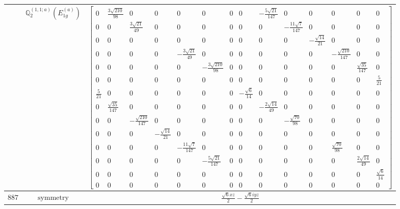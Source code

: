 \documentclass[fleqn,8pt,landscape]{jsarticle}
\begin{document}
\begin{longtable}{ccc}
$  $ & $ \mathbb{Q}_{2}^{(1,1;a)}(E_{1g}^{(a)}) $ & $ \begin{bmatrix} 0 & \frac{3 \sqrt{210}}{98} & 0 & 0 & 0 & 0 & 0 & 0 & - \frac{5 \sqrt{21}}{147} & 0 & 0 & 0 & 0 & 0 \\ 0 & 0 & \frac{3 \sqrt{21}}{49} & 0 & 0 & 0 & 0 & 0 & 0 & - \frac{11 \sqrt{7}}{147} & 0 & 0 & 0 & 0 \\ 0 & 0 & 0 & 0 & 0 & 0 & 0 & 0 & 0 & 0 & - \frac{\sqrt{14}}{21} & 0 & 0 & 0 \\ 0 & 0 & 0 & 0 & - \frac{3 \sqrt{21}}{49} & 0 & 0 & 0 & 0 & 0 & 0 & - \frac{\sqrt{210}}{147} & 0 & 0 \\ 0 & 0 & 0 & 0 & 0 & - \frac{3 \sqrt{210}}{98} & 0 & 0 & 0 & 0 & 0 & 0 & \frac{\sqrt{35}}{147} & 0 \\ 0 & 0 & 0 & 0 & 0 & 0 & 0 & 0 & 0 & 0 & 0 & 0 & 0 & \frac{5}{21} \\ \frac{5}{21} & 0 & 0 & 0 & 0 & 0 & 0 & - \frac{\sqrt{6}}{14} & 0 & 0 & 0 & 0 & 0 & 0 \\ 0 & \frac{\sqrt{35}}{147} & 0 & 0 & 0 & 0 & 0 & 0 & - \frac{2 \sqrt{14}}{49} & 0 & 0 & 0 & 0 & 0 \\ 0 & 0 & - \frac{\sqrt{210}}{147} & 0 & 0 & 0 & 0 & 0 & 0 & - \frac{\sqrt{70}}{98} & 0 & 0 & 0 & 0 \\ 0 & 0 & 0 & - \frac{\sqrt{14}}{21} & 0 & 0 & 0 & 0 & 0 & 0 & 0 & 0 & 0 & 0 \\ 0 & 0 & 0 & 0 & - \frac{11 \sqrt{7}}{147} & 0 & 0 & 0 & 0 & 0 & 0 & \frac{\sqrt{70}}{98} & 0 & 0 \\ 0 & 0 & 0 & 0 & 0 & - \frac{5 \sqrt{21}}{147} & 0 & 0 & 0 & 0 & 0 & 0 & \frac{2 \sqrt{14}}{49} & 0 \\ 0 & 0 & 0 & 0 & 0 & 0 & 0 & 0 & 0 & 0 & 0 & 0 & 0 & \frac{\sqrt{6}}{14} \\ 0 & 0 & 0 & 0 & 0 & 0 & 0 & 0 & 0 & 0 & 0 & 0 & 0 & 0 \end{bmatrix} $ \\ \hline
$ 887 $ & $ \text{symmetry} $ & $ \frac{\sqrt{6} x z}{2} - \frac{\sqrt{6} i y z}{2} $ \\

\end{longtable}
\end{document}
